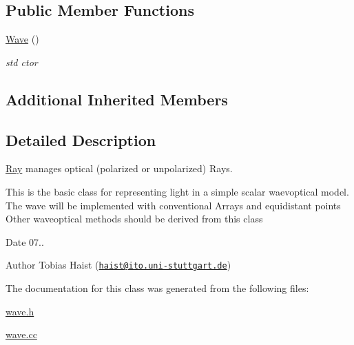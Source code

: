 \subsection*{Public Member Functions}
\begin{DoxyCompactItemize}
\item 
\hyperlink{classWave_a3d8144ec0d6c0b0ede77ff59f54471aa}{Wave} ()\hypertarget{classWave_a3d8144ec0d6c0b0ede77ff59f54471aa}{}\label{classWave_a3d8144ec0d6c0b0ede77ff59f54471aa}

\begin{DoxyCompactList}\small\item\em std ctor \end{DoxyCompactList}\end{DoxyCompactItemize}
\subsection*{Additional Inherited Members}


\subsection{Detailed Description}
\hyperlink{classRay}{Ray} manages optical (polarized or unpolarized) Rays. 

This is the basic class for representing light in a simple scalar waevoptical model. The wave will be implemented with conventional Arrays and equidistant points Other waveoptical methods should be derived from this class

\begin{DoxyDate}{Date}
07.. 
\end{DoxyDate}
\begin{DoxyAuthor}{Author}
Tobias Haist (\href{mailto:haist@ito.uni-stuttgart.de}{\tt haist@ito.\+uni-\/stuttgart.\+de}) 
\end{DoxyAuthor}


The documentation for this class was generated from the following files\+:\begin{DoxyCompactItemize}
\item 
\hyperlink{wave_8h}{wave.\+h}\item 
\hyperlink{wave_8cc}{wave.\+cc}\end{DoxyCompactItemize}
